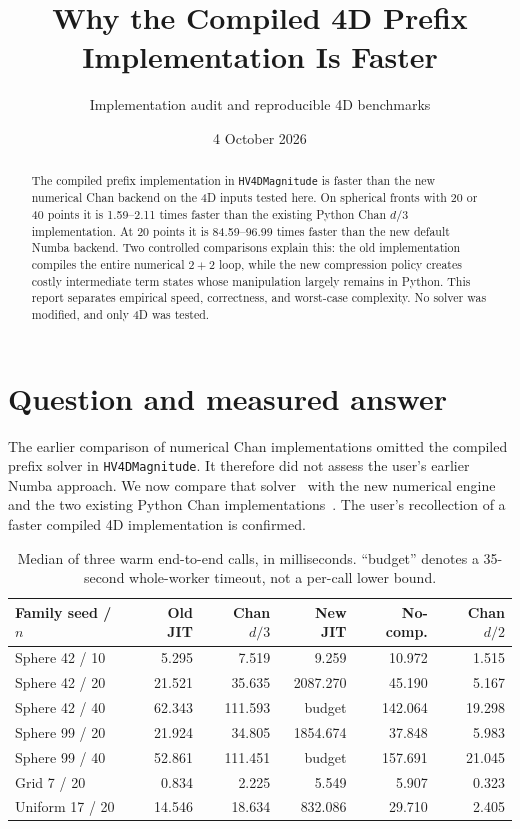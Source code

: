 \documentclass[12pt,a4paper]{article}
\title{Why the Compiled 4D Prefix\protect\\Implementation Is Faster}
\author{Implementation audit and reproducible 4D benchmarks}
\date{4 October 2026}
\begin{document}
\maketitle
\begin{abstract}
The compiled prefix implementation in \texttt{HV4DMagnitude} is faster than
the new numerical Chan backend on the 4D inputs tested here. On spherical
fronts with 20 or 40 points it is 1.59--2.11 times faster than the existing
Python Chan $d/3$ implementation. At 20 points it is 84.59--96.99 times faster
than the new default Numba backend. Two controlled comparisons explain this:
the old implementation compiles the entire numerical $2+2$ loop, while the new
compression policy creates costly intermediate term states whose manipulation
largely remains in Python. This report separates empirical speed, correctness,
and worst-case complexity. No solver was modified, and only 4D was tested.
\end{abstract}

\section{Question and measured answer}
The earlier comparison of numerical Chan implementations omitted the compiled
prefix solver in \texttt{HV4DMagnitude}. It therefore did not assess the user's
earlier Numba approach. We now compare that solver~\cite{old} with the new
numerical engine and the two existing Python Chan implementations~\cite{chan,new}.
The user's recollection of a faster compiled 4D implementation is confirmed.

\begin{table}[ht]
\centering\small
\setlength{\tabcolsep}{4pt}
\begin{tabular}{lrrrrr}\toprule
Family seed / $n$ & Old JIT & Chan $d/3$ & New JIT & No-comp. & Chan $d/2$\\\midrule
Sphere 42 / 10 & 5.295 & 7.519 & 9.259 & 10.972 & 1.515\\
Sphere 42 / 20 & 21.521 & 35.635 & 2087.270 & 45.190 & 5.167\\
Sphere 42 / 40 & 62.343 & 111.593 & budget & 142.064 & 19.298\\
Sphere 99 / 20 & 21.924 & 34.805 & 1854.674 & 37.848 & 5.983\\
Sphere 99 / 40 & 52.861 & 111.451 & budget & 157.691 & 21.045\\
Grid 7 / 20 & 0.834 & 2.225 & 5.549 & 5.907 & 0.323\\
Uniform 17 / 20 & 14.546 & 18.634 & 832.086 & 29.710 & 2.405\\
\bottomrule\end{tabular}
\caption{Median of three warm end-to-end calls, in milliseconds. ``budget''
denotes a 35-second whole-worker timeout, not a per-call lower bound.}
\label{tab:main}
\end{table}
\end{document}
